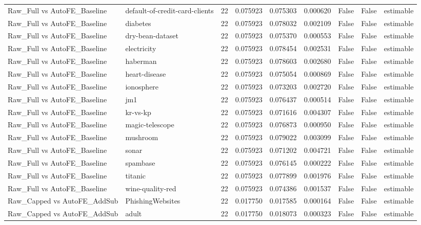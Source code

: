 \begin{table}
\begin{tabular}{llrrrrrrl}
Raw\_Full vs AutoFE\_Baseline & default-of-credit-card-clients & 22 & 0.075923 & 0.075303 & 0.000620 & False & False & estimable \\
Raw\_Full vs AutoFE\_Baseline & diabetes & 22 & 0.075923 & 0.078032 & 0.002109 & False & False & estimable \\
Raw\_Full vs AutoFE\_Baseline & dry-bean-dataset & 22 & 0.075923 & 0.075370 & 0.000553 & False & False & estimable \\
Raw\_Full vs AutoFE\_Baseline & electricity & 22 & 0.075923 & 0.078454 & 0.002531 & False & False & estimable \\
Raw\_Full vs AutoFE\_Baseline & haberman & 22 & 0.075923 & 0.078603 & 0.002680 & False & False & estimable \\
Raw\_Full vs AutoFE\_Baseline & heart-disease & 22 & 0.075923 & 0.075054 & 0.000869 & False & False & estimable \\
Raw\_Full vs AutoFE\_Baseline & ionosphere & 22 & 0.075923 & 0.073203 & 0.002720 & False & False & estimable \\
Raw\_Full vs AutoFE\_Baseline & jm1 & 22 & 0.075923 & 0.076437 & 0.000514 & False & False & estimable \\
Raw\_Full vs AutoFE\_Baseline & kr-vs-kp & 22 & 0.075923 & 0.071616 & 0.004307 & False & False & estimable \\
Raw\_Full vs AutoFE\_Baseline & magic-telescope & 22 & 0.075923 & 0.076873 & 0.000950 & False & False & estimable \\
Raw\_Full vs AutoFE\_Baseline & mushroom & 22 & 0.075923 & 0.079022 & 0.003099 & False & False & estimable \\
Raw\_Full vs AutoFE\_Baseline & sonar & 22 & 0.075923 & 0.071202 & 0.004721 & False & False & estimable \\
Raw\_Full vs AutoFE\_Baseline & spambase & 22 & 0.075923 & 0.076145 & 0.000222 & False & False & estimable \\
Raw\_Full vs AutoFE\_Baseline & titanic & 22 & 0.075923 & 0.077899 & 0.001976 & False & False & estimable \\
Raw\_Full vs AutoFE\_Baseline & wine-quality-red & 22 & 0.075923 & 0.074386 & 0.001537 & False & False & estimable \\
Raw\_Capped vs AutoFE\_AddSub & PhishingWebsites & 22 & 0.017750 & 0.017585 & 0.000164 & False & False & estimable \\
Raw\_Capped vs AutoFE\_AddSub & adult & 22 & 0.017750 & 0.018073 & 0.000323 & False & False & estimable \\

\end{tabular}
\end{table}
